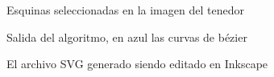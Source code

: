 \documentclass{report}
\begin{document}
\begin{figure}
	\caption{\label{fig:fase1} Esquinas seleccionadas en la imagen del tenedor}
\end{figure}

\begin{figure}
	\caption{\label{fig:fase2} Salida del algoritmo, en azul las curvas de bézier}
\end{figure}

\begin{figure}
	\caption{\label{fig:fase3} El archivo SVG generado siendo editado en Inkscape}
\end{figure}




\nocite{*}
\end{document}
